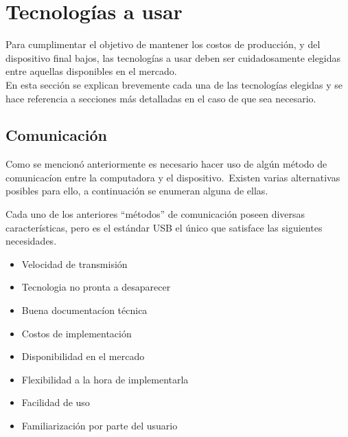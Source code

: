 \chapter{Tecnolog\'ias a usar}%

Para cumplimentar el objetivo de mantener los costos de producci\'on, y del
dispositivo final bajos, las tecnolog\'ias a usar deben ser cuidadosamente
elegidas entre aquellas disponibles en el mercado.\\ 

En esta secci\'on se explican brevemente cada una de las tecnolog\'ias
elegidas y se hace referencia a secciones m\'as detalladas en el caso de que
sea necesario.

\section{Comunicaci\'on} %

Como se mencion\'o anteriormente es necesario hacer uso de alg\'un m\'etodo de
comunicac\'ion entre la computadora y el dispositivo.\ Existen varias
alternativas posibles para ello, a continuaci\'on se enumeran alguna de ellas.\


Cada uno de los anteriores ``m\'etodos'' de comunicaci\'on poseen diversas
caracter\'isticas, pero es el est\'andar USB el \'unico que satisface las
siguientes necesidades.

\begin{itemize}
  \item Velocidad de transmisi\'on
  \item Tecnologia no pronta a desaparecer
  \item Buena documentac\'ion t\'ecnica
  \item Costos de implementaci\'on
  \item Disponibilidad en el mercado
  \item Flexibilidad a la hora de implementarla
  \item Facilidad de uso
  \item Familiarizaci\'on por parte del usuario
\end{itemize}

